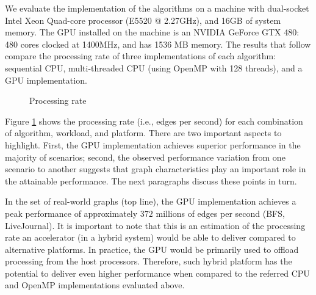 We evaluate the implementation of the algorithms on a machine with dual-socket Intel Xeon Quad-core processor (E5520 @ 2.27GHz), and 16GB of system memory. The GPU installed on the machine is an NVIDIA GeForce GTX 480: 480 cores clocked at 1400MHz, and has 1536 MB memory. The results that follow compare the processing rate of three implementations of each algorithm: sequential CPU, multi-threaded CPU (using OpenMP with 128 threads), and a GPU implementation.

\begin{figure}[ht]
\begin{center}
\mbox{}
\caption{Processing rate}
\label{fig:rate}
\end{center}
\end{figure}

Figure \ref{fig:rate} shows the processing rate (i.e., edges per second) for each combination of algorithm, workload, and platform. There are two important aspects to highlight. First, the GPU implementation achieves superior performance in the majority of scenarios; second, the observed performance variation from one scenario to another suggests that graph characteristics play an important role in the attainable performance. The next paragraphs discuss these points in turn.

In the set of real-world graphs (top line), the GPU implementation achieves a peak performance of approximately $372$ millions of edges per second (BFS, LiveJournal). It is important to note that this is an estimation of the processing rate an accelerator (in a hybrid system) would be able to deliver compared to alternative platforms. In practice, the GPU would be primarily used to offload processing from the host processors. Therefore, such hybrid platform has the potential to deliver even higher performance when compared to the referred CPU and OpenMP implementations evaluated above.

